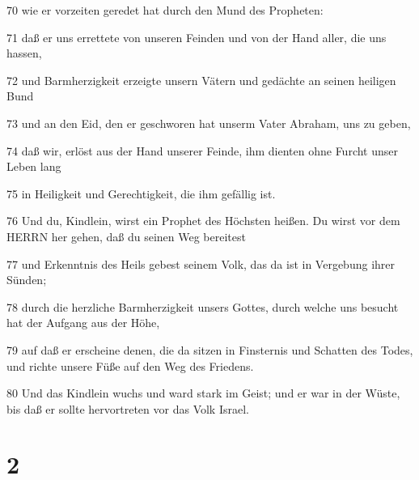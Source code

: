 \par 70 wie er vorzeiten geredet hat durch den Mund des Propheten:
\par 71 daß er uns errettete von unseren Feinden und von der Hand aller, die uns hassen,
\par 72 und Barmherzigkeit erzeigte unsern Vätern und gedächte an seinen heiligen Bund
\par 73 und an den Eid, den er geschworen hat unserm Vater Abraham, uns zu geben,
\par 74 daß wir, erlöst aus der Hand unserer Feinde, ihm dienten ohne Furcht unser Leben lang
\par 75 in Heiligkeit und Gerechtigkeit, die ihm gefällig ist.
\par 76 Und du, Kindlein, wirst ein Prophet des Höchsten heißen. Du wirst vor dem HERRN her gehen, daß du seinen Weg bereitest
\par 77 und Erkenntnis des Heils gebest seinem Volk, das da ist in Vergebung ihrer Sünden;
\par 78 durch die herzliche Barmherzigkeit unsers Gottes, durch welche uns besucht hat der Aufgang aus der Höhe,
\par 79 auf daß er erscheine denen, die da sitzen in Finsternis und Schatten des Todes, und richte unsere Füße auf den Weg des Friedens.
\par 80 Und das Kindlein wuchs und ward stark im Geist; und er war in der Wüste, bis daß er sollte hervortreten vor das Volk Israel.

\chapter{2}

